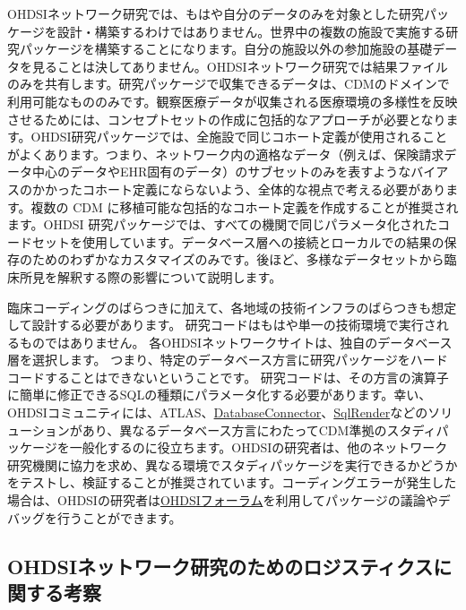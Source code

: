 \documentclass[
  11pt]{book}
\theoremstyle{definition}
\theoremstyle{definition}
\theoremstyle{definition}
\theoremstyle{definition}
\theoremstyle{remark}
\begin{document}
OHDSIネットワーク研究では、もはや自分のデータのみを対象とした研究パッケージを設計・構築するわけではありません。世界中の複数の施設で実施する研究パッケージを構築することになります。自分の施設以外の参加施設の基礎データを見ることは決してありません。OHDSIネットワーク研究では結果ファイルのみを共有します。研究パッケージで収集できるデータは、CDMのドメインで利用可能なもののみです。観察医療データが収集される医療環境の多様性を反映させるためには、コンセプトセットの作成に包括的なアプローチが必要となります。OHDSI研究パッケージでは、全施設で同じコホート定義が使用されることがよくあります。つまり、ネットワーク内の適格なデータ（例えば、保険請求データ中心のデータやEHR固有のデータ）のサブセットのみを表すようなバイアスのかかったコホート定義にならないよう、全体的な視点で考える必要があります。複数の CDM に移植可能な包括的なコホート定義を作成することが推奨されます。OHDSI 研究パッケージでは、すべての機関で同じパラメータ化されたコードセットを使用しています。データベース層への接続とローカルでの結果の保存のためのわずかなカスタマイズのみです。後ほど、多様なデータセットから臨床所見を解釈する際の影響について説明します。

臨床コーディングのばらつきに加えて、各地域の技術インフラのばらつきも想定して設計する必要があります。 研究コードはもはや単一の技術環境で実行されるものではありません。 各OHDSIネットワークサイトは、独自のデータベース層を選択します。 つまり、特定のデータベース方言に研究パッケージをハードコードすることはできないということです。 研究コードは、その方言の演算子に簡単に修正できるSQLの種類にパラメータ化する必要があります。幸い、OHDSIコミュニティには、ATLAS、\href{https://ohdsi.github.io/DatabaseConnector/}{DatabaseConnector}、\href{https://ohdsi.github.io/SqlRender/}{SqlRender}などのソリューションがあり、異なるデータベース方言にわたってCDM準拠のスタディパッケージを一般化するのに役立ちます。OHDSIの研究者は、他のネットワーク研究機関に協力を求め、異なる環境でスタディパッケージを実行できるかどうかをテストし、検証することが推奨されています。コーディングエラーが発生した場合は、OHDSIの研究者は\href{http://forums.ohdsi.org/}{OHDSIフォーラム}を利用してパッケージの議論やデバッグを行うことができます。

\subsection{OHDSIネットワーク研究のためのロジスティクスに関する考察}\label{ohdsiux30cdux30c3ux30c8ux30efux30fcux30afux7814ux7a76ux306eux305fux3081ux306eux30edux30b8ux30b9ux30c6ux30a3ux30afux30b9ux306bux95a2ux3059ux308bux8003ux5bdf}
\end{document}
